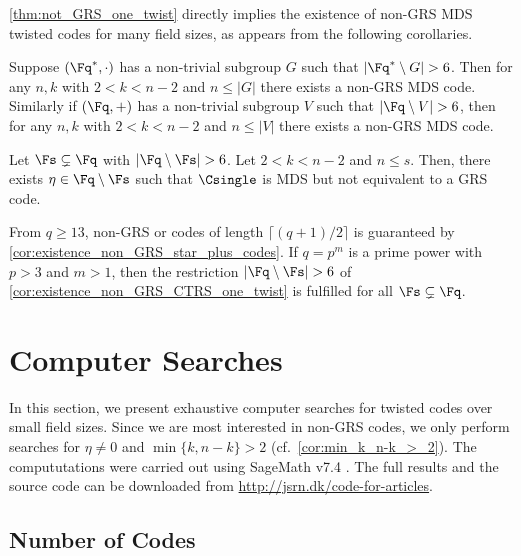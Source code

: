 \documentclass[conference,a4paper]{IEEEtran}
\begin{document}
\cref{thm:not_GRS_one_twist} directly implies the existence of non-GRS MDS twisted codes for many field sizes, as appears from the following corollaries.

\begin{corollary}
  \label{cor:existence_non_GRS_star_plus_codes}
   Suppose $(\Fq^*, \cdot)$ has a non-trivial subgroup $G$ such that $|\Fq^* \setminus G| >6$. Then for any $n, k$ with $2 < k < n-2$ and $n \leq |G|$ there exists a non-GRS MDS \startw code. Similarly if $(\Fq,+)$ has a non-trivial subgroup $V$ such that $|\Fq \setminus V|>6$, then for any $n, k$ with $2 < k < n-2$ and $n \leq |V|$ there exists a non-GRS MDS \plustw code.
\end{corollary}


\begin{corollary}\label{cor:existence_non_GRS_CTRS_one_twist}
Let $\Fs \subsetneq \Fq$ with $|\Fq \setminus \Fs|>6$. Let $2 < k < n-2$ and $n\leq s$.
Then, there exists $\eta \in \Fq \setminus \Fs$ such that $\Csingle$ is MDS but not equivalent to a GRS code.
\end{corollary}

\begin{remark}\label{rem:existence_non-GRS_single-twisted}
From $q \geq 13$, non-GRS \startw or \plustw codes of length $\lceil(q+1)/2 \rceil$ is guaranteed by \cref{cor:existence_non_GRS_star_plus_codes}.
If $q=p^m$ is a prime power with $p>3$ and $m>1$, then the restriction $|\Fq \setminus \Fs|>6$ of \cref{cor:existence_non_GRS_CTRS_one_twist} is fulfilled for all $\Fs \subsetneq \Fq$.
\end{remark}




\section{Computer Searches}
\label{sec:Computer_Searches}

In this section, we present exhaustive computer searches for twisted codes over small field sizes.
Since we are most interested in non-GRS codes, we only perform searches for $\eta \neq 0$ and $\min\{k,n-k\}>2$ (cf.~\cref{cor:min_k_n-k_>_2}).
The compututations were carried out using SageMath v7.4 \cite{stein_sagemath_????}.
The full results and the source code can be downloaded from \url{http://jsrn.dk/code-for-articles}.

\subsection{Number of \Startw Codes}
\end{document}
